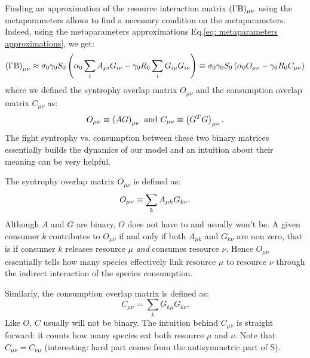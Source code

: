 \documentclass[12pt, titlepage]{report}
\begin{document}
\noindent Finding an approximation of the resource interaction matrix $(\Gamma\text{B})_{\mu \nu}$ using the metaparameters allows to find a necessary condition on the metaparameters. Indeed, using the metaparameters approximations Eq.\eqref{eq: metaparameters approximations}, we get:
\begin{equation}\label{eq: metaparam approximation GammaBeta}
\left(\Gamma \text{B}\right)_{\mu \nu}\approx \sigma_0 \gamma_0 S_0 \left(\alpha_0 \sum_i A_{\mu i}G_{i\nu}-\gamma_0 R_0 \sum_i G_{i\mu}G_{i\nu}\right)\equiv \sigma_0 \gamma_0 S_0 \left(\alpha_0 O_{\mu \nu}-\gamma_0R_0 C_{\mu\nu}\right)
\end{equation}
where we defined the syntrophy overlap matrix $O_{\mu\nu}$ and the consumption overlap matrix $C_{\mu\nu}$ as:
\begin{equation}
O_{\mu\nu} \equiv \left(AG\right)_{\mu \nu} \text{ and } C_{\mu\nu} \equiv \left(G^TG\right)_{\mu\nu}.
\end{equation}
The fight syntrophy vs. consumption between these two binary matrices essentially builds the dynamics of our model and an intuition about their meaning can be very helpful.

The syntrophy overlap matrix $O_{\mu\nu}$ is defined as:
\begin{equation}
O_{\mu\nu} \equiv \sum_k A_{\mu k} G_{k\nu}.
\end{equation}
Although $A$ and $G$ are binary, $O$ does not have to and usually won't be. A given consumer $k$ contributes to $O_{\mu\nu}$ if and only if both $A_{\mu k}$ and $G_{k\nu}$ are non zero, that is if consumer $k$ releases resource $\mu$ \textit{and} consumes resource $\nu$. Hence $O_{\mu\nu}$ essentially tells how many species effectively link resource $\mu$ to resource $\nu$ through the indirect interaction of the species consumption.

\noindent Similarly, the consumption overlap matrix is defined as:
\begin{equation}
C_{\mu\nu}=\sum_k G_{k \mu}G_{k \nu}.
\end{equation}
Like $O$, $C$ usually will not be binary. The intuition behind $C_{\mu\nu}$ is straight forward: it counts how many species eat both resource $\mu$ and $\nu$. Note that $C_{\mu\nu}=C_{\nu\mu}$ (interesting: hard part comes from the antisymmetric part of S).
\end{document}
